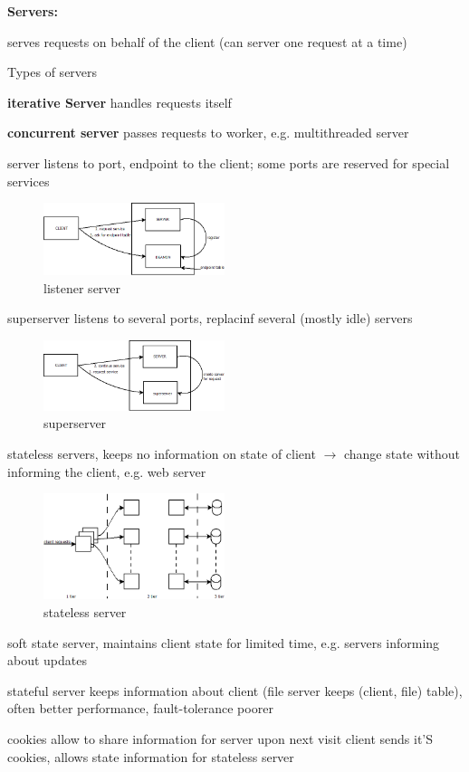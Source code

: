 \textbf{Servers:}\\
\begin{compactitem}
\item serves requests on behalf of the client (can server one request at a time)
	\item Types of servers\\
		\begin{compactitem}
			\item \textbf{iterative Server} handles requests itself
			\item \textbf{concurrent server} passes requests to worker, e.g. multithreaded server
		\end{compactitem}
	\item server listens to port, endpoint to the client; some ports are reserved for special services
\begin{figure}[h]
	\centering
	\includegraphics[width=200px]{gfx/server_deamon.png}
	\caption{listener server}
	\label{img:listener}
\end{figure}
	\item superserver listens to several ports, replacinf several (mostly idle) servers
\begin{figure}[h]
	\centering
	\includegraphics[width=200px]{gfx/superserver.png}
	\caption{superserver}
	\label{img:supserv}
\end{figure}
	\item stateless servers, keeps no information on state of client $\rightarrow$ change state without informing the client, e.g. web server
\begin{figure}[h]
	\centering
	\includegraphics[width=200px]{gfx/server3.png}
	\caption{stateless server}
	\label{img:statel_serv}
\end{figure}
	\item soft state server, maintains client state for limited time, e.g. servers informing about updates
	\item stateful server keeps information about client (file server keeps (client, file) table), often better performance, fault-tolerance poorer
	\item cookies allow to share information for server upon next visit client sends it'S cookies, allows state information for stateless server

\end{compactitem}
